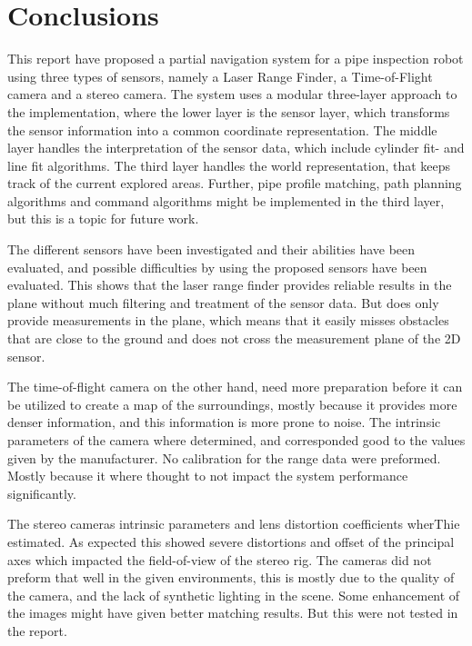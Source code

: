 
\chapter{Conclusions}
\label{chap9}
This report have proposed a partial navigation system for a pipe inspection robot using three
types of sensors, namely a Laser Range Finder, a Time-of-Flight camera and a stereo
camera. The system uses a modular three-layer approach to the implementation, where the lower layer is the
sensor layer, which transforms the sensor information into a common coordinate
representation. The middle layer handles the interpretation of the sensor data, which include cylinder fit-
and line fit algorithms. The third layer handles the world representation, that keeps track of
the current explored areas. Further, pipe profile matching, path planning algorithms and command
algorithms might be implemented in the third layer, but this is a topic for future work. 

The different sensors have been investigated and their abilities have been
evaluated, and possible difficulties by using the proposed sensors have been evaluated.
This shows that the laser range finder provides reliable results in the plane without much
filtering and treatment of the sensor data. But does only provide measurements in the
plane, which means that it easily misses obstacles that are close to the ground and does
not cross the measurement plane of the 2D sensor. 

The time-of-flight camera on the other hand,
need more preparation before it can be utilized to create a map of the surroundings,
mostly because it provides more denser information, and this information is more prone to
noise. The intrinsic parameters of the camera where determined, and corresponded good to
the values given by the manufacturer. No calibration for the range data were preformed.
Mostly because it where thought to not impact the system performance significantly. 

The stereo cameras intrinsic parameters and lens distortion coefficients wherThie estimated.
As expected this showed severe distortions and offset of the principal axes which impacted
the field-of-view of the stereo rig. The cameras did not preform that well in the given
environments, this is mostly due to the quality of the camera, and the lack of synthetic
lighting in the scene. Some enhancement of the images might have given better matching
results. But this were not tested in the report. 

